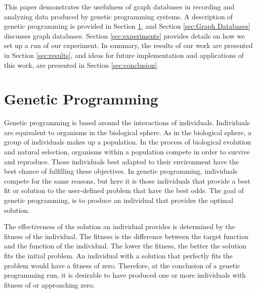 \documentclass[12pt]{article}
\begin{document}
This paper demonstrates the usefulness of graph databases in recording and analyzing data produced by genetic programming systems. A description of genetic programming is provided in Section \ref{Genetic Programming}, and Section \ref{sec:Graph Databases} discusses graph databases. Section \ref{sec:experiments} provides details on how we set up a run of our experiment. In summary, the results of our work are presented in Section \ref{sec:results}, and ideas for future implementation and applications of this work, are presented in Section \ref{sec:conclusion}.

\section{Genetic Programming} \label{Genetic Programming}

Genetic programming is based around the interactions of individuals. Individuals are equivalent to organisms in the biological sphere. As in the biological sphere, a group of individuals makes up a population. In the process of biological evolution and natural selection, organisms within a population compete in order to survive and reproduce. Those individuals best adapted to their environment have the best chance of fulfilling these objectives.  In genetic programming, individuals compete for the same reasons, but here it is those individuals that provide a best fit or solution to the user-defined problem that have the best odds. The goal of genetic programming, is to produce an individual that provides the optimal solution.

The effectiveness of the solution an individual provides is determined by the fitness of the individual. The fitness is the difference between the target function and the function of the individual. The lower the fitness, the better the solution fits the initial problem. An individual with a solution that perfectly fits the problem would have a fitness of zero. Therefore, at the conclusion of a genetic programming run, it is desirable to have produced one or more individuals with fitness of or approaching zero.
\end{document}
